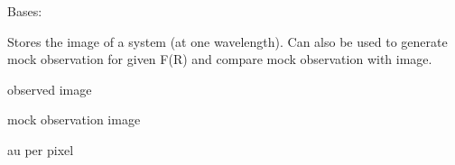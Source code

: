 \documentclass[a4paper,11pt,english]{sphinxmanual}
\begin{document}

\begin{fulllineitems}
\label{\detokenize{x22:disk_model.DiskImage}}
\pysigstartsignatures
\pysiglinewithargsret
{}
{\sphinxparamcomma {}\sphinxparamcomma {}\sphinxparamcomma {}\sphinxparamcomma {}\sphinxparamcomma {}\sphinxparamcomma {}\sphinxparamcomma {}}
{}
\pysigstopsignatures
\sphinxAtStartPar
Bases: 

\sphinxAtStartPar
Stores the image of a system (at one wavelength).
Can also be used to generate mock observation for given F(R) and
compare mock observation with image.

\begin{fulllineitems}
\label{\detokenize{x22:disk_model.DiskImage.img}}
\pysigstartsignatures
\pysigline
{}
\pysigstopsignatures
\sphinxAtStartPar
observed image

\end{fulllineitems}


\begin{fulllineitems}
\label{\detokenize{x22:disk_model.DiskImage.img_model}}
\pysigstartsignatures
\pysigline
{}
\pysigstopsignatures
\sphinxAtStartPar
mock observation image

\end{fulllineitems}


\begin{fulllineitems}
\label{\detokenize{x22:disk_model.DiskImage.au_per_pix}}
\pysigstartsignatures
\pysigline
{}
\pysigstopsignatures
\sphinxAtStartPar
au per pixel


\end{fulllineitems}
\end{fulllineitems}
\end{document}

